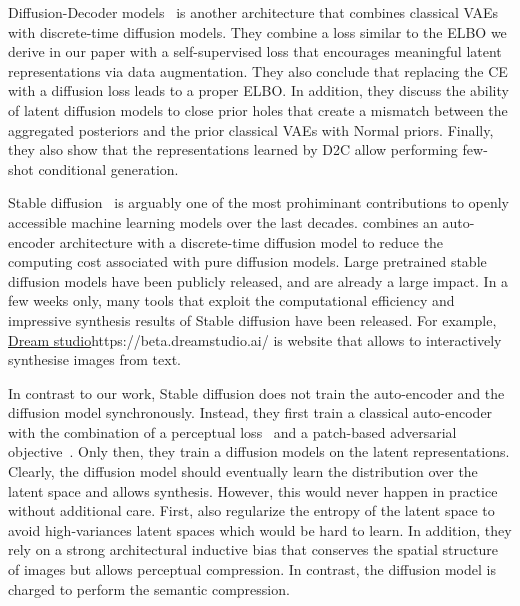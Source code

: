 Diffusion-Decoder models~\citep[][D2C]{sinha2021d2c} is another architecture that combines classical VAEs with discrete-time diffusion models. They combine a loss similar to the ELBO we derive in our paper with a self-supervised loss that encourages meaningful latent representations via data augmentation. They also conclude that replacing the CE with a diffusion loss leads to a proper ELBO. In addition, they discuss the ability of latent diffusion models to close prior holes that create a mismatch between the aggregated posteriors and the prior classical VAEs with Normal priors. Finally, they also show that the representations learned by D2C allow performing few-shot conditional generation.

Stable diffusion~\citep{rombach2022high} is arguably one of the most prohiminant contributions to openly accessible machine learning models over the last decades. \citet{rombach2022high} combines an auto-encoder architecture with a discrete-time diffusion model to reduce the computing cost associated with pure diffusion models. Large pretrained stable diffusion models have been publicly released, and are already a large impact. In a few weeks only, many tools that exploit the computational efficiency and impressive synthesis results of Stable diffusion have been released. For example, \url{Dream studio}{https://beta.dreamstudio.ai/} is website that allows to interactively synthesise images from text.

In contrast to our work, Stable diffusion does not train the auto-encoder and the diffusion model synchronously. Instead, they first train a classical auto-encoder with the combination of a perceptual loss~\citep{zhang2018unreasonable} and a patch-based adversarial objective~\citep{dosovitskiy2016generating, esser2021taming, yu2021vector}. Only then, they train a diffusion models on the latent representations. Clearly, the diffusion model should eventually learn the distribution over the latent space and allows synthesis. However, this would never happen in practice without additional care. First, \citet{rombach2022high} also regularize the entropy of the latent space to avoid high-variances latent spaces which would be hard to learn. In addition, they rely on a strong architectural inductive bias that conserves the spatial structure of images but allows perceptual compression. In contrast, the diffusion model is charged to perform the semantic compression.


